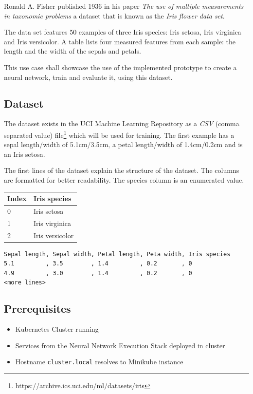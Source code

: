Ronald A. Fisher published 1936 in his paper \emph{The use of multiple
measurements in taxonomic problems} \cite{fisher} a dataset that is
known as the \emph{Iris flower data set}.

The data set \cite{fisher} features 50 examples of three Iris species:
Iris setosa, Iris virginica and Iris versicolor. A table lists four
measured features from each sample: the length and the width of the
sepals and petals.

This use case shall showcase the use of the implemented prototype to
create a neural network, train and evaluate it, using this dataset.

\subsection{Dataset}\label{dataset}

The dataset exists in the UCI Machine Learning Repository
\cite{uci-iris} as a \emph{CSV} (comma separated value) file\footnote{https://archive.ics.uci.edu/ml/datasets/iris}
which will be used for training. The first example has a sepal
length/width of 5.1cm/3.5cm, a petal length/width of 1.4cm/0.2cm and is
an Iris setosa.

The first lines of the dataset explain the structure of the dataset. The
columns are formatted for better readability. The species column is an
enumerated value.

\begin{longtable}[]{@{}ll@{}}
\toprule
Index & Iris species\tabularnewline
\midrule
\endhead
0 & Iris setosa\tabularnewline
1 & Iris virginica\tabularnewline
2 & Iris versicolor\tabularnewline
\bottomrule
\end{longtable}

\begin{verbatim}
Sepal length, Sepal width, Petal length, Peta width, Iris species
5.1         , 3.5        , 1.4         , 0.2       , 0
4.9         , 3.0        , 1.4         , 0.2       , 0
<more lines>
\end{verbatim}

\subsection{Prerequisites}\label{prerequisites-2}

\begin{itemize}
\tightlist
\item
  Kubernetes Cluster running
\item
  Services from the Neural Network Execution Stack deployed in cluster
\item
  Hostname \texttt{cluster.local} resolves to Minikube instance
\end{itemize}

